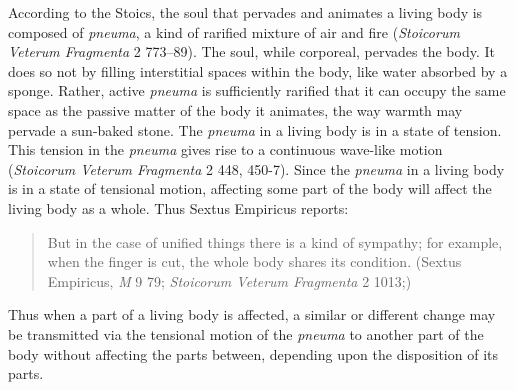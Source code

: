 According to the Stoics, the soul that pervades and animates a living body is composed of \emph{pneuma}, a kind of rarified mixture of air and fire (\emph{Stoicorum Veterum Fragmenta} 2 773--89). The soul, while corporeal, pervades the body. It does so not by filling interstitial spaces within the body, like water absorbed by a sponge. Rather, active \emph{pneuma} is sufficiently rarified that it  can occupy the same space as the passive matter of the body it animates, the way warmth may pervade a sun-baked stone. The \emph{pneuma} in a living body is in a state of tension. This tension in the \emph{pneuma} gives rise to a continuous wave-like motion (\emph{Stoicorum Veterum Fragmenta} 2 448, 450-7). Since the \emph{pneuma} in a living body is in a state of tensional motion, affecting some part of the body will affect the living body as a whole. Thus Sextus Empiricus reports: 
\begin{quote}
	But in the case of unified things there is a kind of sympathy; for example, when the finger is cut, the whole body shares its condition. (Sextus Empiricus, \emph{M} 9 79; \emph{Stoicorum Veterum Fragmenta} 2 1013;)
\end{quote}
Thus when a part of a living body is affected, a similar or different change may be transmitted via the tensional motion of the \emph{pneuma} to another part of the body without affecting the parts between, depending upon the disposition of its parts.

